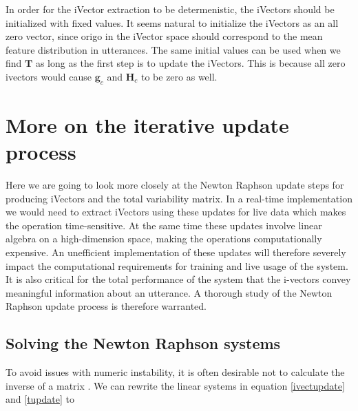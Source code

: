 In order for the iVector extraction to be determenistic, the iVectors should be initialized with fixed values. It seems natural to initialize the iVectors as an all zero vector, since origo in the iVector space should correspond to the mean feature distribution in utterances. The same initial values can be used when we find $\mathbf{T}$ as long as the first step is to update the iVectors. This is because all zero ivectors would cause $\mathbf{g}_c$ and $\mathbf{H}_c$ to be zero as well.

\section{More on the iterative update process}
\label{sect:deeperivect}

Here we are going to look more closely at the Newton Raphson update steps for producing iVectors and the total variability matrix. In a real-time implementation we would need to extract iVectors using these updates for live data which makes the operation time-sensitive. At the same time these updates involve linear algebra on a high-dimension space, making the operations computationally expensive. An unefficient implementation of these updates will therefore severely impact the computational requirements for training and live usage of the system. It is also critical for the total performance of the system that the i-vectors convey meaningful information about an utterance. A thorough study of the Newton Raphson update process is therefore warranted. 

\subsection{Solving the Newton Raphson systems}

To avoid issues with numeric instability, it is often desirable not to calculate the inverse of a matrix \cite[p. 743]{cormen}. We can rewrite the linear systems in equation \ref{ivectupdate} and \ref{tupdate} to

